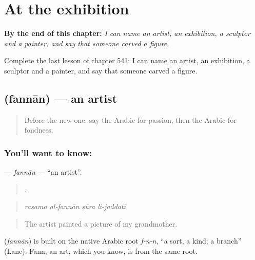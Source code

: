 
\chapter{At the exhibition}
\label{ch:ar-at-the-exhibition}

\begin{chapteropening}
\textbf{By the end of this chapter:} \emph{I can name an artist, an exhibition, a sculptor and a painter, and say that someone carved a figure.}

Complete the last lesson of chapter 541: I can name an artist, an exhibition, a sculptor and a painter, and say that someone carved a figure.
\end{chapteropening}

\section[\texorpdfstring{\ar{فنان} (fannān)}{فنان (fannān)}]{ (fannān) — an artist}

\label{lesson:AR-C541-fannan}



\begin{quote}
Before the new one: say the Arabic for passion, then the Arabic for fondness.
\end{quote}

\subsection*{You'll want to know: }
\textbf{} — \emph{fannān} — \textquotedblleft{}an artist\textquotedblright{}.

\begin{quote}
   .
\end{quote}

\begin{quote}
\emph{rasama al-fannān ṣūra li-jaddatī.}
\end{quote}

\begin{quote}
The artist painted a picture of my grandmother.
\end{quote}

\begin{cousinweb}
\textbf{} (\emph{fannān}) is built on the native Arabic root \emph{f-n-n}, \textquotedblleft{}a sort, a kind; a branch\textquotedblright{} (Lane). Fann, an art, which you know, is from the same root.
\end{cousinweb}

